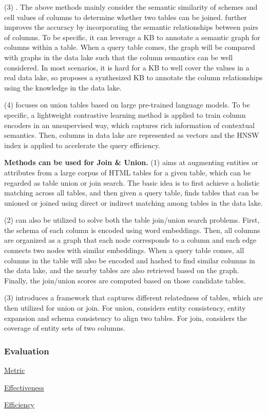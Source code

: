  \noindent  (3) \santos. The above methods mainly consider  the semantic similarity of  schemes and cell values of columns to determine whether two tables can be joined.
   \santos further improves the accuracy by incorporating the semantic relationships between pairs of columns. To be specific,  it can leverage a KB to annotate a semantic graph for columns within a table. When a query table comes, the graph will be compared with graphs in the data lake such that the column semantics can be well considered. In most scenarios, it is hard for a KB to well cover the values in a real data lake, so \santos proposes a synthesized KB to annotate the column relationships using the knowledge in the data lake.

 \noindent  (4) \starmie focuses on union tables based on large  pre-trained language models. To be specific, a lightweight contrastive learning method is applied to train 
column encoders in an unsupervised way, which captures rich information of contextual semantics. Then, columns in data lake are represented as vectors and the HNSW index is applied to accelerate the query efficiency.


\noindent\textbf{Methods can be used for Join \& Union.}
  (1) \infogather aims at augmenting entities or attributes from a large corpus of HTML tables for a given table, which can be regarded as table union or join search. The basic idea is to first achieve a holistic matching across all tables, and then  given a query table,  \infogather finds tables that can be unioned or joined using direct or indirect matching among tables in the data lake.
 
 
  \noindent  (2) \aurum can also be utilized to solve  both the table join/union search problems. First, the schema of each column is encoded using word embeddings. Then, all columns are organized as a graph that each node corresponds to a column and each edge connects two nodes with similar embeddings. When a query table comes, all columns in the table will also be encoded and hashed to find similar columns in the data lake, and  the nearby tables are also retrieved based on the graph. Finally, the join/union scores are computed based on those candidate tables.  
  
    \noindent  (3) \frt introduces a framework that captures different relatedness of tables, which are then utilized for union or join. For union,  \frt considers entity consistency, entity expansion and schema consistency to align two tables. For join, \frt considers the coverage of entity sets of two columns.

\subsubsection{Evaluation}

\noindent\underline{Metric}

\noindent\underline{Effectiveness}

\noindent\underline{Efficiency}


